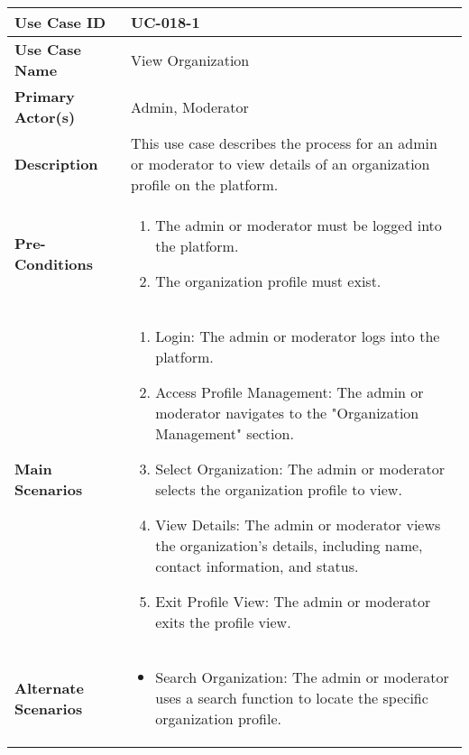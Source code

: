 \begin{table}[!ht]
    \centering
    \renewcommand{\arraystretch}{1.3} %
    \begin{tabularx}{\textwidth}{|l|X|}
        \hline
        \textbf{Use Case ID} & UC-018-1 \\
        \hline
        \textbf{Use Case Name} & View Organization \\
        \hline
        \textbf{Primary Actor(s)} & Admin, Moderator \\
        \hline
        \textbf{Description} & This use case describes the process for an admin or moderator to view details of an organization profile on the platform. \\
        \hline
        \textbf{Pre-Conditions} & 
        \begin{enumerate}[label=\arabic*.,itemsep=0pt]
            \item The admin or moderator must be logged into the platform.
            \item The organization profile must exist.
        \end{enumerate} \\
        \hline
        \textbf{Main Scenarios} & 
        \begin{enumerate}[label=\arabic*.,itemsep=0pt]
            \item Login: The admin or moderator logs into the platform.
            \item Access Profile Management: The admin or moderator navigates to the "Organization Management" section.
            \item Select Organization: The admin or moderator selects the organization profile to view.
            \item View Details: The admin or moderator views the organization's details, including name, contact information, and status.
            \item Exit Profile View: The admin or moderator exits the profile view.
        \end{enumerate} \\
        \hline
        \textbf{Alternate Scenarios} & 
        \begin{itemize}[label=--,itemsep=0pt]
            \item Search Organization: The admin or moderator uses a search function to locate the specific organization profile.
        \end{itemize} \\

\end{tabularx}
\end{table}
